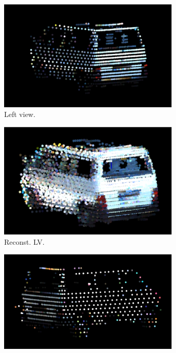 \documentclass[10pt,twocolumn,letterpaper]{article}  %
\begin{document}
\begin{figure}[thpb]
\vspace{-3mm}
\centering
	\begin{subfigure}{0.25\textwidth}
  	\centering
 	\includegraphics[height=0.05\textheight, width=0.95\textwidth]{image/leftSparse_car.eps}%
  	\caption{Left view.}
  	\label{fig:leftSparse_car}
	\end{subfigure}%
	\begin{subfigure}{0.25\textwidth}
 	\centering
  	\includegraphics[height=0.05\textheight, width=0.95\textwidth]{image/leftDense_car.eps}%
  	\caption{Reconst. LV.}
  	\label{fig:leftDense_car} 
  	\end{subfigure}%
  	\begin{subfigure}{0.25\textwidth}
  	\centering
 	\includegraphics[height=0.05\textheight, width=0.95\textwidth]{image/rightSparse_car.eps}%

\end{subfigure}
\end{figure}
\end{document}
